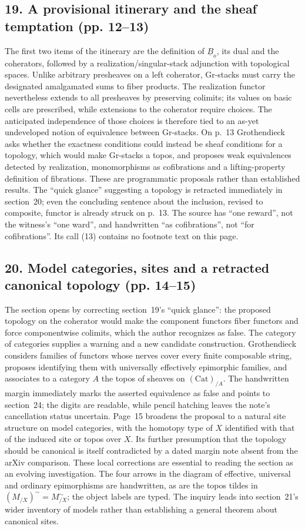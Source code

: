\subsection*{19. A provisional itinerary and the sheaf temptation (pp. 12--13)}
The first two items of the itinerary are the definition of $\underline B_o$, its dual and the coherators, followed by a realization/singular-stack adjunction with topological spaces. Unlike arbitrary presheaves on a left coherator, Gr-stacks must carry the designated amalgamated sums to fiber products. The realization functor nevertheless extends to all presheaves by preserving colimits; its values on basic cells are prescribed, while extensions to the coherator require choices. The anticipated independence of those choices is therefore tied to an as-yet undeveloped notion of equivalence between Gr-stacks. On p.~13 Grothendieck asks whether the exactness conditions could instead be sheaf conditions for a topology, which would make Gr-stacks a topos, and proposes weak equivalences detected by realization, monomorphisms as cofibrations and a lifting-property definition of fibrations. These are programmatic proposals rather than established results. The ``quick glance'' suggesting a topology is retracted immediately in section~20; even the concluding sentence about the inclusion, revised to composite, functor is already struck on p.~13. The source has ``one reward'', not the witness's ``one ward'', and handwritten ``as cofibrations'', not ``for cofibrations''. Its call (13) contains no footnote text on this page.

\subsection*{20. Model categories, sites and a retracted canonical topology (pp. 14--15)}
The section opens by correcting section~19's ``quick glance'': the proposed topology on the coherator would make the component functors fiber functors and force componentwise colimits, which the author recognizes as false. The category of categories supplies a warning and a new candidate construction. Grothendieck considers families of functors whose nerves cover every finite composable string, proposes identifying them with universally effectively epimorphic families, and associates to a category $A$ the topos of sheaves on $(\mathrm{Cat})_{/A}$. The handwritten margin immediately marks the asserted equivalence as false and points to section~24; the digits are readable, while pencil hatching leaves the note's cancellation status uncertain. Page~15 broadens the proposal to a natural site structure on model categories, with the homotopy type of $X$ identified with that of the induced site or topos over $X$. Its further presumption that the topology should be canonical is itself contradicted by a dated margin note absent from the arXiv comparison. These local corrections are essential to reading the section as an evolving investigation. The four arrows in the diagram of effective, universal and ordinary epimorphisms are handwritten, as are the topos tildes in $(M_{/X})^{\sim}=M^{\sim}_{/X}$; the object labels are typed. The inquiry leads into section~21's wider inventory of models rather than establishing a general theorem about canonical sites.

